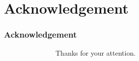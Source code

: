 \section*{Acknowledgement\label{sec:9}}

\begin{frame}
\frametitle{\normalsize{Acknowledgement}}\transwipe


\LARGE

\vspace{16pt}

~~~~~~~~~~~~~~~Thanks for your attention.


\end{frame} 
